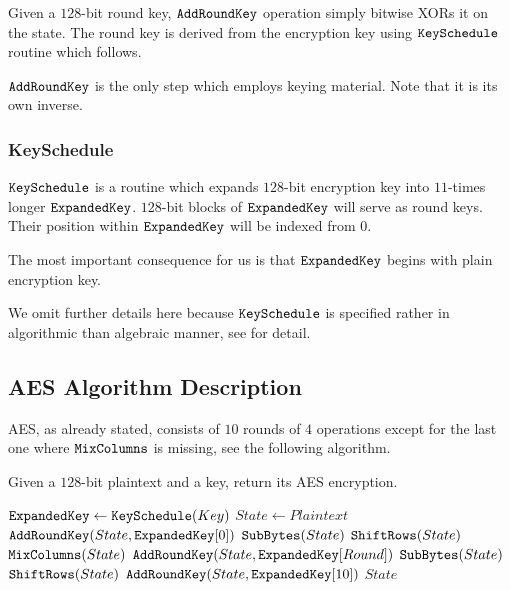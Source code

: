 	Given a $128$-bit round key, $\texttt{AddRoundKey}$ operation simply bitwise XORs it on the state. The round key is derived from the encryption key using $\texttt{KeySchedule}$ routine which follows.
	
	$\texttt{AddRoundKey}$ is the only step which employs keying material. Note that it is its own inverse.

\subsubsection{KeySchedule}
	
	$\texttt{KeySchedule}$ is a routine which expands $128$-bit encryption key into $11$-times longer $\texttt{ExpandedKey}$. $128$-bit blocks of $\texttt{ExpandedKey}$ will serve as round keys. Their position within $\texttt{ExpandedKey}$ will be indexed from $0$.
	
	\begin{note}
	\label{note:expkey}
		The most important consequence for us is that $\texttt{ExpandedKey}$ begins with plain encryption key.
	\end{note}
	
	We omit further details here because $\texttt{KeySchedule}$ is specified rather in algorithmic than algebraic manner, see \cite[pp.43-45]{daemen2013rijndael} for detail.



\subsection{AES Algorithm Description}

AES, as already stated, consists of $10$ rounds of $4$ operations except for the last one where $\texttt{MixColumns}$ is missing, see the following algorithm.

\begin{alg}
\label{alg:aes}
	Given a $128$-bit plaintext and a key, return its AES encryption.
	\begin{algorithmic}[1]
			\State $\texttt{ExpandedKey} \gets \texttt{KeySchedule}(Key)$
			\State $State \gets Plaintext$ \label{line:stateplain}
			\State $\texttt{AddRoundKey}(State, \texttt{ExpandedKey}[0])$ \label{line:addrk}
				\State $\texttt{SubBytes}(State)$
				\State $\texttt{ShiftRows}(State)$
				\State $\texttt{MixColumns}(State)$
				\State $\texttt{AddRoundKey}(State, \texttt{ExpandedKey}[Round])$
			\EndFor
			\State $\texttt{SubBytes}(State)$
			\State $\texttt{ShiftRows}(State)$
			\State $\texttt{AddRoundKey}(State, \texttt{ExpandedKey}[10])$
			\State\Return $State$
		\EndFunction
	\end{algorithmic}
\end{alg}

